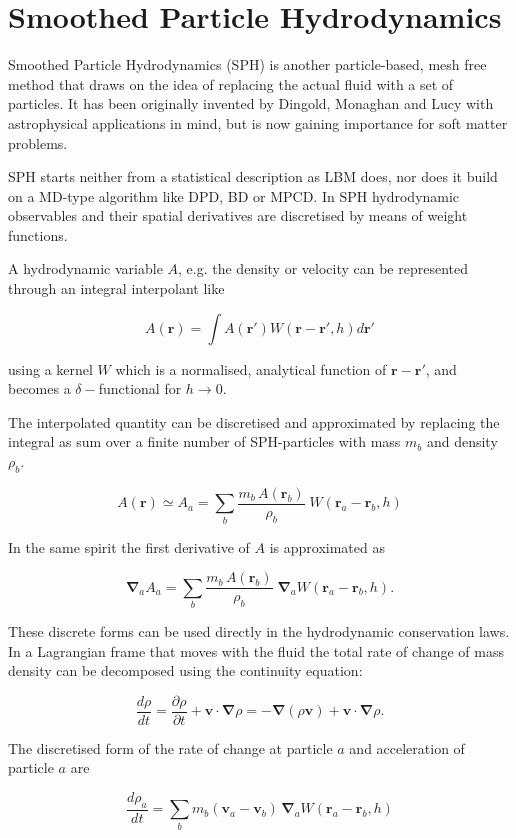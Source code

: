 \documentclass[8.5pt,twoside,twocolumn]{article}
\newcommand{\beq}{\begin{equation}}
\newcommand{\eeq}{\end{equation}}
\begin{document}
\section{Smoothed Particle Hydrodynamics}

Smoothed Particle Hydrodynamics (SPH) is another particle-based, mesh free method
that draws on the idea of replacing the actual fluid with a set of particles.
It has been originally invented by Dingold, Monaghan and Lucy
with astrophysical applications in mind, but is now gaining importance for soft matter
problems.

SPH starts neither from a statistical description as LBM does, nor does it
build on a MD-type algorithm like DPD, BD or MPCD. In SPH hydrodynamic observables 
and their spatial derivatives are discretised by means of 
weight functions.

A hydrodynamic variable $A$, e.g. the density or velocity can be represented 
through an integral interpolant like  

\beq
A(\mathbf{r})=\int A(\mathbf{r'}) W(\mathbf{r}-\mathbf{r'},h ) d\mathbf{r'}
\eeq

using a kernel $W$ which is a normalised, analytical function of $\mathbf{r}-\mathbf{r'}$,
 and becomes a $\delta-$functional for $h\to0$.  

The interpolated quantity can be discretised and approximated by replacing the integral 
as sum over a finite number of SPH-particles with mass $m_b$ and density $\rho_b$.

\beq
A(\mathbf{r})\simeq A_a= \sum_b \frac{m_b\, A(\mathbf{r}_b)}{\rho_b} \;W(\mathbf{r}_a-\mathbf{r}_b, h)
\eeq

In the same spirit the first derivative of $A$ is approximated as

\beq
\mathbf{\nabla}_a A_a= \sum_b \frac{m_b\, A(\mathbf{r}_b)}{\rho_b} \;\mathbf{\nabla}_aW(\mathbf{r}_a-\mathbf{r}_b, h).
\eeq

These discrete forms can be used directly in the hydrodynamic conservation laws.
In a Lagrangian frame that moves with the fluid the total rate of 
change of mass density can be decomposed using the continuity equation:

\beq
\frac{d\rho}{dt}=\frac{\partial\rho}{\partial t} + \mathbf{v}\cdot\mathbf{\nabla}\rho =-\mathbf{\nabla}(\rho \mathbf{v})+\mathbf{v}\cdot\mathbf{\nabla}\rho.
\eeq

The discretised form of the rate of change at particle $a$ and acceleration of particle $a$ are

\beq
\frac{d\rho_a}{dt}=\sum_b m_b (\mathbf{v}_a-\mathbf{v}_b)\,\mathbf{\nabla}_a W(\mathbf{r}_a-\mathbf{r}_b,h)
\eeq
\end{document}
